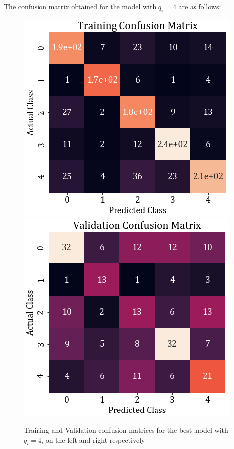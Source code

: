 \documentclass[11pt,a4paper]{article}
\newcommand{\noi}{\noindent}
\begin{document}
\noi
The confusion matrix obtained for the model with $q_i=4$ are as follows:
\begin{figure}[H]
    \centering
    \includegraphics[scale=0.5]{images/2A/2A_full_train_conf.png}
    \includegraphics[scale=0.5]{images/2A/2A_full_val_conf.png}
    \caption{Training and Validation confusion matrices for the best model with $q_i=4$, on the left and right respectively}
\end{figure}
\end{document}
